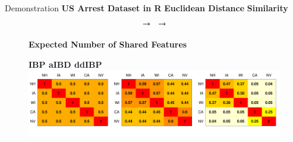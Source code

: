 \documentclass[serif,mathserif,final]{beamer}
\begin{document}
\begin{frame}{}
\begin{columns}[t]
\begin{column}{0.56\linewidth}
 \begin{block}{Demonstration}
        \hspace{4em}\textbf{US Arrest Dataset in R}
        \hspace{6em}\textbf{Euclidean Distance}
        \hspace{6.5em}\textbf{Similarity}
        \vspace{-.5em}
        \[
          
          \hspace{.5em}\rightarrow\hspace{.5em}
          
          \hspace{.5em}\rightarrow\hspace{.5em}
          
        \]

        \vspace{1em}
        \begin{figure}[htb]
          \centering
          \textbf{Expected Number of Shared Features}\\ \vspace{.5em}
          \raggedright{\small\textsf{\textbf{\hspace{8.5em}IBP \hspace{15.5em} aIBD \hspace{15em} ddIBP}}}\\
          \includegraphics[width=.99\columnwidth]{sharedFeatures}

        \end{figure}
        \vspace{-2em}
      \end{block}











\end{column}
\end{columns}
\end{frame}
\end{document}
